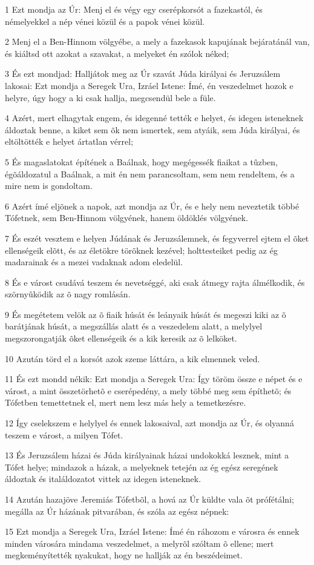 \par 1 Ezt mondja az Úr: Menj el és végy egy cserépkorsót a fazekastól, és némelyekkel a nép vénei közül és a papok vénei közül.
\par 2 Menj el a Ben-Hinnom völgyébe, a mely a fazekasok kapujának bejáratánál van, és kiáltsd ott azokat a szavakat, a melyeket én szólok néked;
\par 3 És ezt mondjad: Halljátok meg az Úr szavát Júda királyai és Jeruzsálem lakosai: Ezt mondja a Seregek Ura, Izráel Istene: Ímé, én veszedelmet hozok e helyre, úgy hogy a ki csak hallja, megcsendül bele a füle.
\par 4 Azért, mert elhagytak engem, és idegenné tették e helyet, és idegen isteneknek áldoztak benne, a kiket sem õk nem ismertek, sem atyáik, sem Júda királyai, és eltöltötték e helyet  ártatlan vérrel;
\par 5 És magaslatokat építének a Baálnak, hogy megégessék fiaikat a tûzben, égõáldozatul a Baálnak, a mit én nem parancsoltam, sem nem rendeltem, és a mire nem is gondoltam.
\par 6 Azért ímé eljõnek a napok, azt mondja az Úr, és e hely nem neveztetik többé Tófetnek, sem Ben-Hinnom völgyének, hanem öldöklés völgyének.
\par 7 És eszét vesztem e helyen Júdának és Jeruzsálemnek, és fegyverrel ejtem el õket ellenségeik elõtt, és az életökre törõknek kezével; holttesteiket pedig az ég madarainak és a mezei vadaknak adom eledelül.
\par 8 És e várost csudává teszem és nevetséggé, aki csak átmegy rajta álmélkodik, és szörnyûködik az õ nagy romlásán.
\par 9 És megétetem velök az õ fiaik húsát és leányaik húsát és megeszi kiki az õ barátjának húsát, a megszállás alatt és a veszedelem alatt, a melylyel megszorongatják õket ellenségeik és a kik keresik az õ lelköket.
\par 10 Azután törd el a korsót azok szeme láttára, a kik elmennek veled.
\par 11 És ezt mondd nékik: Ezt mondja a Seregek Ura: Így töröm össze e népet és e várost, a mint összetörhetõ e cserépedény, a mely többé meg sem építhetõ; és Tófetben temettetnek el, mert nem lesz más hely a temetkezésre.
\par 12 Így cselekszem e helylyel és ennek lakosaival, azt mondja az Úr, és olyanná teszem e várost, a milyen Tófet.
\par 13 És Jeruzsálem házai és Júda királyainak házai undokokká lesznek, mint a Tófet helye; mindazok a házak, a melyeknek  tetején az ég egész seregének áldoztak és italáldozatot vittek az idegen isteneknek.
\par 14 Azután hazajöve Jeremiás Tófetbõl, a hová az Úr küldte vala õt prófétálni; megálla az Úr házának pitvarában, és szóla az egész népnek:
\par 15 Ezt mondja a Seregek Ura, Izráel Istene: Ímé én ráhozom e városra és ennek minden városára mindama veszedelmet, a melyrõl szóltam õ ellene; mert megkeményítették nyakukat, hogy ne hallják az én beszédeimet.

